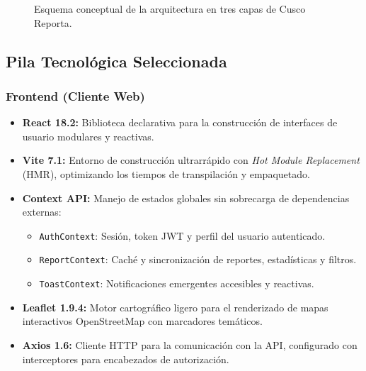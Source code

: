 \documentclass[12pt,a4paper]{article}
\begin{document}
\begin{figure}[H]
    \centering
    \begin{center}
    \setlength{\fboxsep}{10pt}
    \setlength{\fboxrule}{1pt}
    \end{center}
    \caption{Esquema conceptual de la arquitectura en tres capas de Cusco Reporta.}
    \label{fig:arquitectura}
\end{figure}

\subsection{Pila Tecnológica Seleccionada}

\subsubsection{Frontend (Cliente Web)}
\begin{itemize}[leftmargin=*]
    \item \textbf{React 18.2:} Biblioteca declarativa para la construcción de interfaces de usuario modulares y reactivas.
    \item \textbf{Vite 7.1:} Entorno de construcción ultrarrápido con \textit{Hot Module Replacement} (HMR), optimizando los tiempos de transpilación y empaquetado.
    \item \textbf{Context API:} Manejo de estados globales sin sobrecarga de dependencias externas:
        \begin{itemize}
            \item \texttt{AuthContext}: Sesión, token JWT y perfil del usuario autenticado.
            \item \texttt{ReportContext}: Caché y sincronización de reportes, estadísticas y filtros.
            \item \texttt{ToastContext}: Notificaciones emergentes accesibles y reactivas.
        \end{itemize}
    \item \textbf{Leaflet 1.9.4:} Motor cartográfico ligero para el renderizado de mapas interactivos OpenStreetMap con marcadores temáticos.
    \item \textbf{Axios 1.6:} Cliente HTTP para la comunicación con la API, configurado con interceptores para encabezados de autorización.
\end{itemize}
\end{document}
